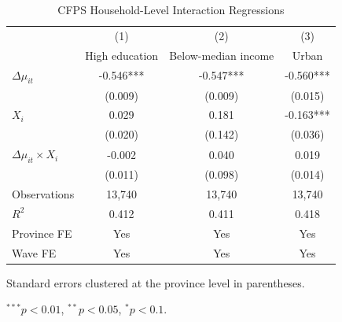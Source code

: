 \begin{table}[!htbp]
\centering
\caption{CFPS Household-Level Interaction Regressions}
\label{tab:cfps_interactions}
\begin{threeparttable}
\begin{tabular}{lccc}
\toprule
 & (1) & (2) & (3) \\
 & High education & Below-median income & Urban \\
\midrule
$\Delta \mu_{it}$ & -0.546*** & -0.547*** & -0.560*** \\
 & (0.009) & (0.009) & (0.015) \\
$X_i$ & 0.029 & 0.181 & -0.163*** \\
 & (0.020) & (0.142) & (0.036) \\
$\Delta \mu_{it} \times X_i$ & -0.002 & 0.040 & 0.019 \\
 & (0.011) & (0.098) & (0.014) \\
\midrule
Observations & 13,740 & 13,740 & 13,740 \\
$R^2$ & 0.412 & 0.411 & 0.418 \\
Province FE & Yes & Yes & Yes \\
Wave FE & Yes & Yes & Yes \\
\bottomrule
\end{tabular}
\begin{tablenotes}[flushleft]
\footnotesize
\item Standard errors clustered at the province level in parentheses.
\item $^{***}p<0.01$, $^{**}p<0.05$, $^{*}p<0.1$.
\end{tablenotes}
\end{threeparttable}
\end{table}
